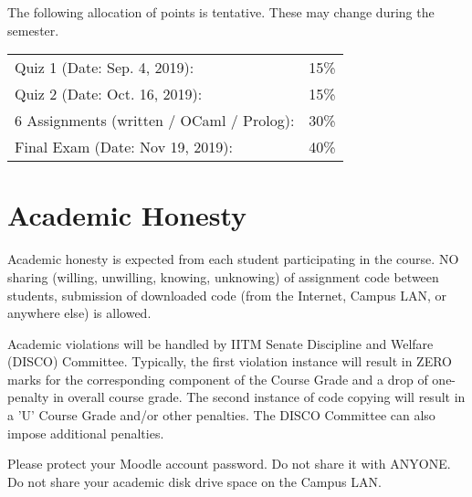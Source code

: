 \documentclass[10pt]{article}
\begin{document}
The following allocation of points is tentative. These may change
during the semester.

\begin{center}
  \begin{tabular}{ll}
Quiz 1 (Date: Sep. 4, 2019): & 15\% \\
Quiz 2 (Date: Oct. 16, 2019): & 15\% \\
6 Assignments (written / OCaml / Prolog): & 30\% \\
Final Exam (Date: Nov 19, 2019): & 40\%
  \end{tabular}
\end{center}

\section{Academic Honesty}

Academic honesty is expected from each student participating in the course.  NO
sharing (willing, unwilling, knowing, unknowing) of assignment code between
students, submission of downloaded code (from the Internet, Campus LAN, or
anywhere else) is allowed.

Academic violations will be handled by IITM Senate Discipline and Welfare
(DISCO) Committee.  Typically, the first violation instance will result in ZERO
marks for the corresponding component of the Course Grade and a drop of one-
penalty in overall course grade. The second instance of code copying will
result in a 'U' Course Grade and/or other penalties. The DISCO Committee can
also impose additional penalties.

Please protect your Moodle account password. Do not share it with ANYONE. Do
not share your academic disk drive space on the Campus LAN.
\end{document}
